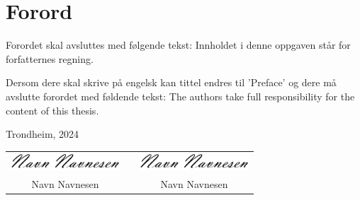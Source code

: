 \chapter*{Forord}


Forordet skal avsluttes med følgende tekst:
Innholdet i denne oppgaven står for forfatternes regning.

Dersom dere skal skrive på engelsk kan tittel endres til 'Preface' og dere må avslutte forordet med føldende tekst:
The authors take full responsibility for the content of this thesis.

\vfill
\noindent Trondheim, 2024
\vspace{0.5cm}


\begin{table}[H]
    \centering
    \begin{tabular}{ccccc}
    \multicolumn{2}{c}{\includegraphics[width = 11em]{images/signatur.png}} & \quad\quad\quad\quad\quad & \multicolumn{2}{c}{\includegraphics[width = 11em]{images/signatur.png}}\\
    \multicolumn{2}{c}{Navn Navnesen} &  & \multicolumn{2}{c}{Navn Navnesen}\\
    \end{tabular}
\end{table}